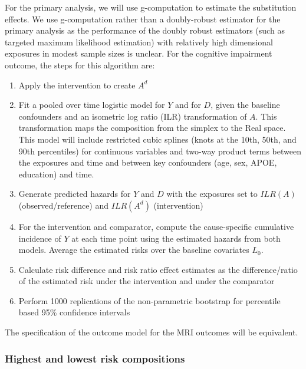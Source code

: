 \documentclass{article}
\begin{document}
For the primary analysis, we will use g-computation to estimate the substitution effects. We use g-computation rather than a doubly-robust estimator for the primary analysis as the performance of the doubly robust estimators (such as targeted maximum likelihood estimation) with relatively high dimensional exposures in modest sample sizes is unclear. For the cognitive impairment outcome, the steps for this algorithm are:
\begin{enumerate}
    \item Apply the intervention to create $A^d$
    \item Fit a pooled over time logistic model for $Y$ and for $D$, given the baseline confounders and an isometric log ratio (ILR) transformation of $A$. This transformation maps the composition from the simplex to the Real space. This model will include restricted cubic splines (knots at the 10th, 50th, and 90th percentiles) for continuous variables and two-way product terms between the exposures and time and between key confounders (age, sex, APOE, education) and time.
    \item Generate predicted hazards for $Y$ and $D$ with the exposures set to $ILR(A)$ (observed/reference) and $ILR(A^d)$ (intervention)
    \item For the intervention and comparator, compute the cause-specific cumulative incidence of $Y$ at each time point using the estimated hazards from both models. Average the estimated risks over the baseline covariates $L_0$.
    \item Calculate risk difference and risk ratio effect estimates as the difference/ratio of the estimated risk under the intervention and under the comparator
    \item Perform 1000 replications of the non-parametric bootstrap for percentile based 95\% confidence intervals
\end{enumerate}

The specification of the outcome model for the MRI outcomes will be equivalent.

\subsubsection{Highest and lowest risk compositions}
\end{document}
